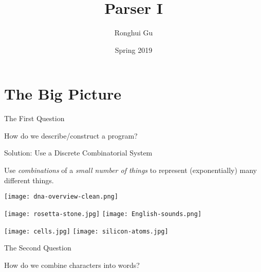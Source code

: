 \documentclass{plt}
\title{Parser I}
\author{Ronghui Gu}
\institute{Columbia University}
\date{Spring 2019}
\begin{document}
\frame{\titlepage}

\part{The Big Picture}

\begin{frame}{The First Question}
  \begin{center}
    \large How do we describe/construct a program?
%
  \end{center}
\end{frame}

\begin{frame}{Solution: Use a Discrete Combinatorial System}

Use \emph{combinations} of a \emph{small number of things} to
represent (exponentially) many different things.

\begin{minipage}{0.2\textwidth}
\texttt{[image: dna-overview-clean.png]}
\end{minipage}%
\begin{minipage}{0.8\textwidth}
\hfill
\texttt{[image: rosetta-stone.jpg]} \hfill
\texttt{[image: English-sounds.png]}

\hfill
\texttt{[image: cells.jpg]}
\hfill
\texttt{[image: silicon-atoms.jpg]}
\end{minipage}

\end{frame}

\begin{frame}{The Second Question}
  \begin{center}
    \large How do we combine \alert{characters} into \alert{words}? 

  \end{center}
\end{frame}
\end{document}
